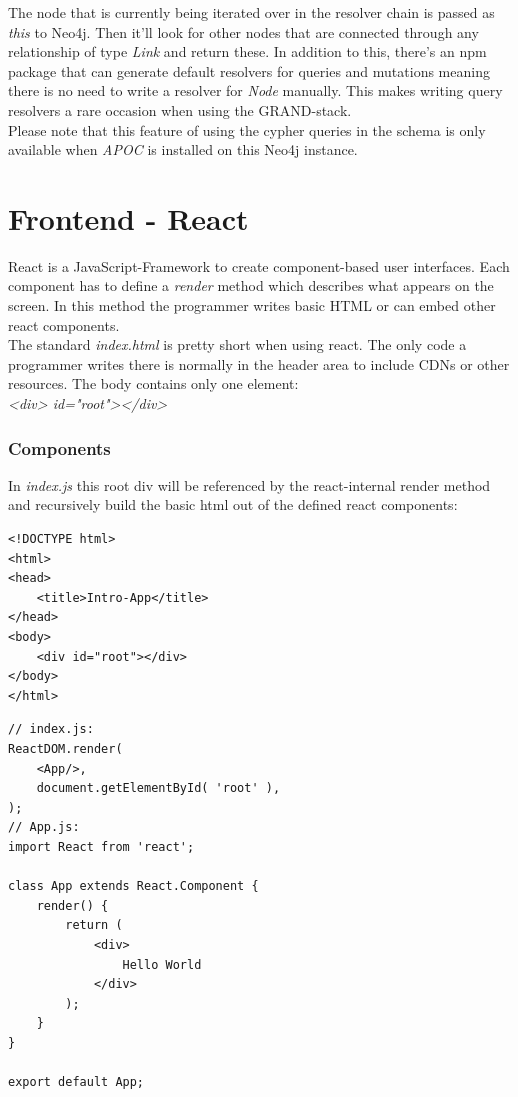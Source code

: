 The node that is currently being iterated over in the resolver chain is passed as \emph{this} to Neo4j. Then it'll look for other nodes that are connected through any relationship of type \emph{Link} and return these. In addition to this, there's an npm package that can generate default resolvers for queries and mutations meaning there is no need to write a resolver for \emph{Node} manually. This makes writing query resolvers a rare occasion when using the GRAND-stack. \\

Please note that this feature of using the cypher queries in the schema is only available when \emph{APOC} is installed on this Neo4j instance.

\newpage
\section{Frontend - React}
React is a JavaScript-Framework to create component-based user interfaces. Each component has to define a \emph{render} method which describes what appears on the screen. In this method the programmer writes basic HTML or can embed other react components. \\
The standard \emph{index.html} is pretty short when using react. The only code a programmer writes there is normally in the header area to include CDNs or other resources. The body contains only one element: \\
\emph{<div> id="root"></div>} 

\subsubsection{Components}
In \emph{index.js} this root div will be referenced by the react-internal render method and recursively build the basic html out of the defined react components:
\lstset{language=HTML}
\begin{lstlisting}[caption={index.html for Hello World},label={ex250}]
<!DOCTYPE html>
<html>
<head>
	<title>Intro-App</title>
</head>
<body>
	<div id="root"></div>
</body>
</html>
\end{lstlisting}

\lstset{language=JavaScript}
\begin{lstlisting}[caption={Hello World in React},label={ex251}]
// index.js:
ReactDOM.render(
	<App/>,
	document.getElementById( 'root' ),
);
// App.js:
import React from 'react';

class App extends React.Component {
	render() {
		return (
			<div>
				Hello World
			</div>
		);
	}
}

export default App;
\end{lstlisting}

